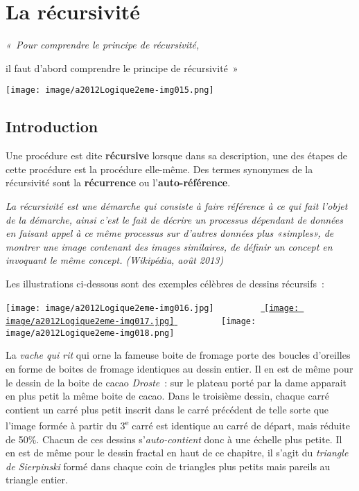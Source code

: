 \chapter{La récursivité}

\begin{center}
	{\itshape «~Pour comprendre le principe de récursivité, 
	
	il faut d'abord comprendre le principe de récursivité~»}

	\texttt{[image: image/a2012Logique2eme-img015.png]}
\end{center}
	

\section{Introduction}
	
	Une procédure est dite \textbf{récursive} lorsque dans sa description, 
	une des étapes de cette procédure est la procédure elle-même. 
	Des termes synonymes de la récursivité sont la \textbf{récurrence} 
	ou l'\textbf{auto-référence}.
	
	\textit{La récursivité est une démarche qui consiste à faire 
	référence à ce qui fait l'objet de la démarche, ainsi c'est
	le fait de décrire un processus dépendant de données en faisant 
	appel à ce même processus sur d'autres données plus
	«simples», de montrer une image contenant des images similaires, 
	de définir un concept en invoquant le même concept.
	(Wikipédia, août 2013)}

	Les illustrations ci-dessous sont des exemples célèbres 
	de dessins récursifs~:

	{
	 \texttt{[image: image/a2012Logique2eme-img016.jpg]} 
	\ \ \ \ \ \ \ \ \ 
	\href{http://upload.wikimedia.org/wikipedia/commons/6/62/Droste.jpg}{
	\texttt{[image: image/a2012Logique2eme-img017.jpg]} } 
	\ \ \ \ \ \ \ \ \ 
	\texttt{[image: image/a2012Logique2eme-img018.png]} }


	La \textit{vache qui rit} qui orne la fameuse boite 
	de fromage porte des boucles d'oreilles en forme de boites de
	fromage identiques au dessin entier. Il en est de même pour 
	le dessin de la boite de cacao \textit{Droste}~: sur le
	plateau porté par la dame apparait en plus petit la même 
	boite de cacao. Dans le troisième dessin, chaque carré
	contient un carré plus petit inscrit dans le carré précédent 
	de telle sorte que l'image formée à partir du 3\textsuperscript{e} 
	carré est identique au carré de départ, mais réduite de 50\%. 
	Chacun de ces dessins s'\textit{auto-contient} donc à une échelle 
	plus petite. Il en est de même pour le dessin fractal en haut de
	ce chapitre, il s'agit du \textit{triangle de Sierpinski} 
	formé dans chaque coin de triangles plus petits mais pareils
	au triangle entier.


